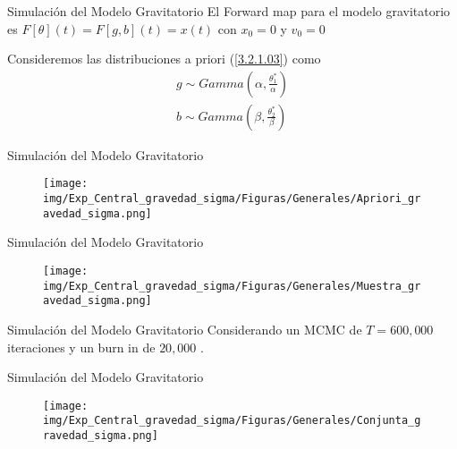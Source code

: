 \documentclass[10pt,aspectratio=169]{beamer}
\begin{document}
\begin{frame}{Simulación del Modelo Gravitatorio}
  El Forward map para el modelo gravitatorio es $F[\theta](t) = F[g,b] (t)= x(t)$ con $x_0 = 0$ y $v_0 = 0$

  Consideremos las distribuciones a priori (\ref{3.2.1.03}) como
  \begin{align}
    g \sim Gamma \left(\alpha, \frac{\theta_1^{*}}{\alpha}\right) \\
    b \sim Gamma \left(\beta, \frac{\theta_2^{*}}{\beta}\right) 
  \end{align}
  
\end{frame}

\begin{frame}{Simulación del Modelo Gravitatorio}
  
\begin{figure} 
  \centering 
  \texttt{[image: img/Exp\_Central\_gravedad\_sigma/Figuras/Generales/Apriori\_gravedad\_sigma.png]}
  \label{Fig. 3.2.2.01}
  \end{figure} 
\end{frame}

\begin{frame}{Simulación del Modelo Gravitatorio}
  
  \begin{figure}
    \centering 
    \texttt{[image: img/Exp\_Central\_gravedad\_sigma/Figuras/Generales/Muestra\_gravedad\_sigma.png]} 
    \label{Fig. 3.2.2.02}
  \end{figure} 
\end{frame}

\begin{frame}{Simulación del Modelo Gravitatorio}
  Considerando un MCMC de $T = 600,000$ iteraciones y un burn in de $20,000$ \cite{christen2010general}. 
\end{frame}

\begin{frame}{Simulación del Modelo Gravitatorio}
  \begin{figure}
    \centering 
    \texttt{[image: img/Exp\_Central\_gravedad\_sigma/Figuras/Generales/Conjunta\_gravedad\_sigma.png]} 
    \label{Fig. 3.2.2.03}
  \end{figure} 
\end{frame}
\end{document}
